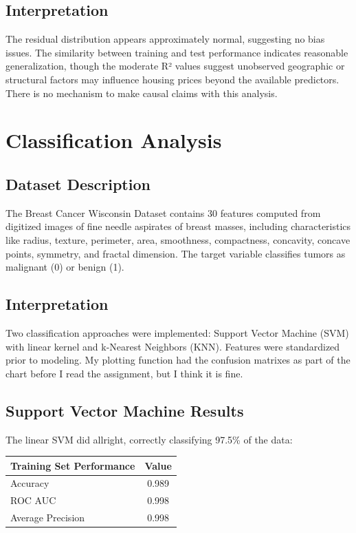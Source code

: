 \documentclass[letterpaper, 11pt]{amsart}
\begin{document}
\subsection{Interpretation}
The residual distribution appears approximately normal, suggesting no bias issues. The similarity between training and test performance indicates reasonable generalization, though the moderate R² values suggest unobserved geographic or structural factors may influence housing prices beyond the available predictors. There is no mechanism to make causal claims with this analysis.


\section{Classification Analysis}
\subsection{Dataset Description}
The Breast Cancer Wisconsin Dataset contains 30 features computed from digitized images of fine needle aspirates of breast masses, including characteristics like radius, texture, perimeter, area, smoothness, compactness, concavity, concave points, symmetry, and fractal dimension. The target variable classifies tumors as malignant (0) or benign (1).

\subsection{Interpretation}
Two classification approaches were implemented: Support Vector Machine (SVM) with linear kernel and k-Nearest Neighbors (KNN). Features were standardized prior to modeling. My plotting function had the confusion matrixes as part of the chart before I read the assignment, but I think it is fine.

\subsection{Support Vector Machine Results}
The linear SVM did allright, correctly classifying 97.5\% of the data:

\begin{table}[h]
\centering
\begin{tabular}{l|c|}
\textbf{Training Set Performance} & \textbf{Value} \\
\hline
Accuracy & 0.989 \\
ROC AUC & 0.998 \\
Average Precision & 0.998 \\
\hline
\end{tabular}
\end{table}
\end{document}
